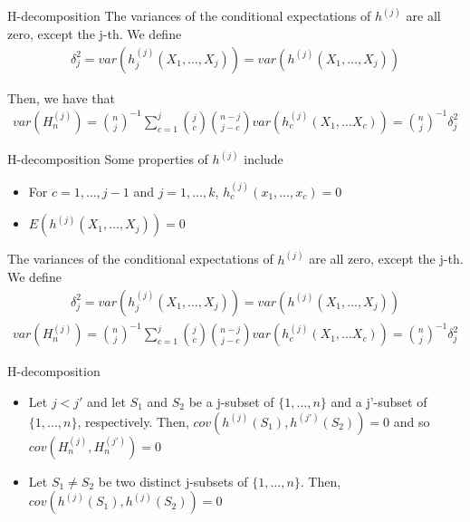 \documentclass{beamer}
\theoremstyle{definition}
\numberwithin{Def}{section}
\begin{document}
\begin{frame}{H-decomposition}
The variances of the conditional expectations of $h^{(j)}$ are all zero, except the j-th. We define 
    \begin{align}
        \delta_j^2 = var(h_j^{(j)}(X_1, \dotsc, X_j)) = var(h^{(j)}(X_1, \dotsc, X_j))
    \end{align}
    
    Then, we have that 
    \begin{align}
        var(H_n^{(j)}) = {n \choose j}^{-1}\sum_{c=1}^j {j \choose c}{n-j \choose j-c}var(h_c^{(j)}(X_1, \dotsc X_c)) = {n \choose j}^{-1}\delta_j^2
    \end{align}
\end{frame}

\begin{frame}{H-decomposition}
     Some properties of $h^{(j)}$ include
    \begin{theorem}
    \begin{itemize}
        \item For $c = 1, \dotsc, j-1$ and $j = 1, \dotsc, k$, $h_c^{(j)}(x_1, \dotsc, x_c) = 0$
        \item $E(h^{(j)}(X_1, \dotsc, X_j)) = 0$
    \end{itemize}
    \end{theorem}
    
   The variances of the conditional expectations of $h^{(j)}$ are all zero, except the j-th. We define 
    \begin{align}
        \delta_j^2 = var(h_j^{(j)}(X_1, \dotsc, X_j)) = var(h^{(j)}(X_1, \dotsc, X_j))
    \end{align}
    \begin{align}
        var(H_n^{(j)}) = {n \choose j}^{-1}\sum_{c=1}^j {j \choose c}{n-j \choose j-c}var(h_c^{(j)}(X_1, \dotsc X_c)) = {n \choose j}^{-1}\delta_j^2
         \end{align}
    \end{frame} 
    
    \begin{frame}{H-decomposition}
        
        \begin{theorem}
    \begin{itemize}
        \item Let $j <j'$ and let $S_1$ and $S_2$ be a j-subset of $\{1, \dotsc, n\}$ and a j'-subset of $\{1, \dotsc, n\}$, respectively. Then, $cov(h^{(j)}(S_1), h^{(j')}(S_2)) = 0$ and so $cov(H_n^{(j)}, H_n^{(j')}) = 0$
        \item Let $S_1 \neq S_2$ be two distinct j-subsets of $\{1, \dotsc, n\}$. Then, $cov(h^{(j)}(S_1), h^{(j)}(S_2)) = 0$
    \end{itemize}
    \end{theorem}
    \end{frame}
    
\end{document}
